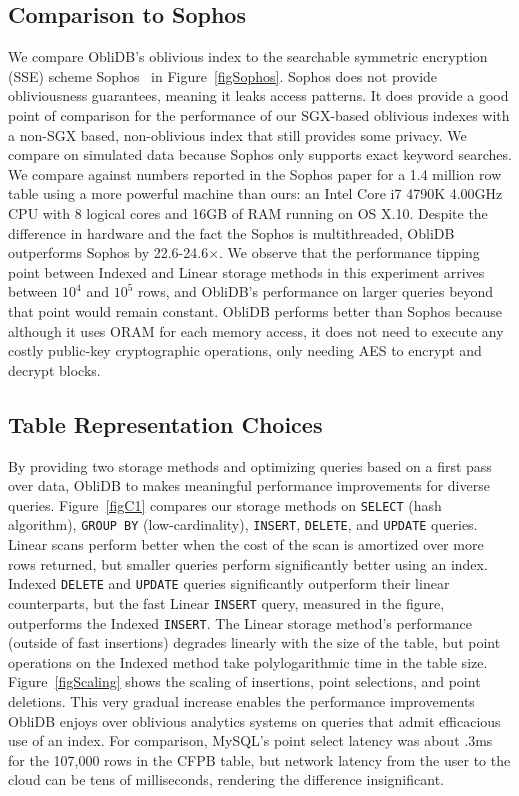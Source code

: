 \documentclass[letterpaper,twocolumn,10pt]{article}
\def\name/{ObliDB}
\begin{document}
\subsection{Comparison to Sophos}
We compare \name/'s oblivious index to the searchable symmetric encryption (SSE) scheme Sophos~\cite{Bost16} in Figure~\ref{figSophos}. Sophos does not provide obliviousness guarantees, meaning it leaks access patterns. It does provide a good point of comparison for the performance of our SGX-based oblivious indexes with a non-SGX based, non-oblivious index that still provides some privacy. We compare on simulated data because Sophos only supports exact keyword searches. We compare against numbers reported in the Sophos paper for a 1.4 million row table using a more powerful machine than ours: an Intel Core i7 4790K 4.00GHz CPU with 8 logical cores and 16GB of RAM running on OS X.10. Despite the difference in hardware and the fact the Sophos is multithreaded, \name/ outperforms Sophos by 22.6-24.6$\times$. We observe that the performance tipping point between Indexed and Linear storage methods in this experiment arrives between $10^4$ and $10^5$ rows, and \name/'s performance on larger queries beyond that point would remain constant. \name/ performs better than Sophos because although it uses ORAM for each memory access, it does not need to execute any costly public-key cryptographic operations, only needing AES to encrypt and decrypt blocks.

\subsection{Table Representation Choices}
By providing two storage methods and optimizing queries based on a first pass over data, \name/ to makes meaningful performance improvements for diverse queries. Figure~\ref{figC1} compares our storage methods on \texttt{SELECT} (hash algorithm), \texttt{GROUP BY} (low-cardinality), \texttt{INSERT}, \texttt{DELETE}, and \texttt{UPDATE} queries. Linear scans perform better when the cost of the scan is amortized over more rows returned, but smaller queries perform significantly better using an index. Indexed \texttt{DELETE} and \texttt{UPDATE} queries significantly outperform their linear counterparts, but the fast Linear \texttt{INSERT} query, measured in the figure, outperforms the Indexed \texttt{INSERT}. The Linear storage method's performance (outside of fast insertions) degrades linearly with the size of the table, but point operations on the Indexed method take polylogarithmic time in the table size. Figure~\ref{figScaling} shows the scaling of insertions, point selections, and point deletions. This very gradual increase enables the performance improvements \name/ enjoys over oblivious analytics systems on queries that admit efficacious use of an index. For comparison, MySQL's point select latency was about .3ms for the 107,000 rows in the CFPB table, but network latency from the user to the cloud can be tens of milliseconds, rendering the difference insignificant.
\end{document}
